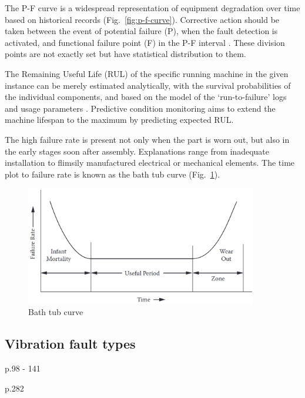 The P-F curve is a widespread representation of equipment degradation over time based on historical records (Fig.~\ref{fig:p-f-curve}). Corrective action should be taken between the event of potential failure (P), when the fault detection is activated, and functional failure point (F) in the P-F interval \cite{bousdekis_enterprise_2021}.  These division points are not exactly set but have statistical distribution to them.

The Remaining Useful Life (RUL) of the specific running machine in the given instance can be merely estimated analytically, with the survival probabilities of the individual components, and based on the model of the `run-to-failure' logs and usage parameters \cite{okoh_overview_2014}. Predictive condition monitoring aims to extend the machine lifespan to the maximum by predicting expected RUL.

The high failure rate is present not only when the part is worn out, but also in the early stages soon after assembly. Explanations range from inadequate installation to flimsily manufactured electrical or mechanical elements. The time plot to failure rate is known as the bath tub curve (Fig.~\ref{fig:bath-tub-curve}).

\begin{figure}[h]
	\centering
	\includegraphics[width=0.9\textwidth]{assets/bath-tub-curve.png}
	\caption{Bath tub curve \cite{mohanty_machinery_2015}}
	\label{fig:bath-tub-curve}
\end{figure}

\subsection{Vibration fault types}
\cite{scheffer_practical_2004} p.98 - 141

\cite{davies_handbook_2012} p.282
\cite{torres_automatic_2022}
\cite{noauthor_vibration_2000}
\cite{cakir_experimental_2021}
\cite{ziaran_technicka_2013}

